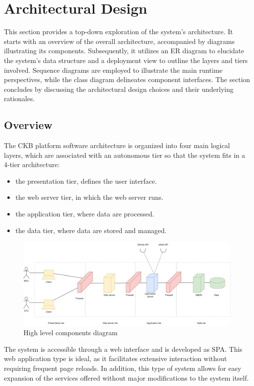 \chapter{Architectural Design}
This section provides a top-down exploration of the system's architecture.
It starts with an overview of the overall architecture, accompanied by diagrams illustrating its components.
Subsequently, it utilizes an ER diagram to elucidate the system's data structure and a deployment view to outline the layers and tiers involved.
Sequence diagrams are employed to illustrate the main runtime perspectives, while the class diagram delineates component interfaces.
The section concludes by discussing the architectural design choices and their underlying rationales.

\section{Overview}
The CKB platform software architecture is organized into four main logical layers, which are associated with an autonomous tier so that the system fits in a 4-tier architecture:
\begin{itemize}
    \item the presentation tier, defines the user interface.
    \item the web server tier, in which the web server runs.
    \item the application tier, where data are processed.
    \item the data tier, where data are stored and managed.
\end{itemize}

\begin{figure}[H]
    \centering
    \includegraphics[width=\textwidth]{images/diagrams/high_level_diagram.png}
    \caption{High level components diagram}
\end{figure}

The system is accessible through a web interface and is developed as SPA.
This web application type is ideal, as it facilitates extensive interaction without requiring frequent page reloads.
In addition, this type of system allows for easy expansion of the services offered without major modifications to the system itself.


